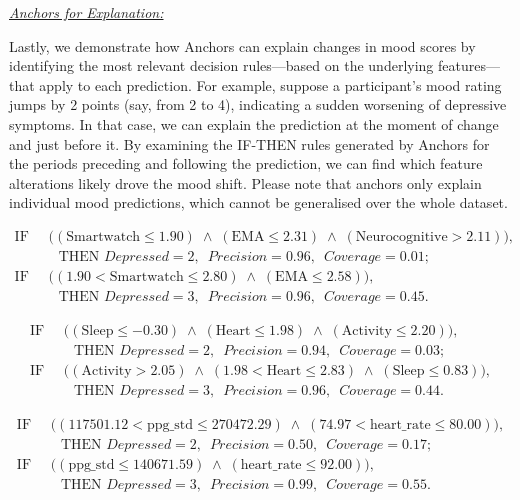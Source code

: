 \underline{\textit{Anchors for Explanation:}} 

Lastly, we demonstrate how Anchors can explain changes in mood scores by identifying the most relevant decision rules—based on the underlying features—that apply to each prediction. For example, suppose a participant's mood rating jumps by 2 points (say, from 2 to 4), indicating a sudden worsening of depressive symptoms. In that case, we can explain the prediction at the moment of change and just before it. By examining the IF-THEN rules generated by Anchors for the periods preceding and following the prediction,  we can find which feature alterations likely drove the mood shift. Please note that anchors only explain individual mood predictions, which cannot be generalised over the whole dataset.


\begin{equation}\label{eq:anchor19_3}
\begin{split}
\text{IF }&\;\bigl((\text{Smartwatch} \le 1.90)
    \;\land\; (\text{EMA} \le 2.31)
    \;\land\; (\text{Neurocognitive} > 2.11)\bigr),\\
 &\quad\text{THEN }Depressed = 2,\;\ Precision = 0.96,\;\ Coverage = 0.01;\\[6pt]
\text{IF }&\;\bigl((1.90 < \text{Smartwatch} \le 2.80)
    \;\land\; (\text{EMA} \le 2.58)\bigr),\\
 &\quad\text{THEN }Depressed = 3,\;\ Precision = 0.96,\;\ Coverage = 0.45.
\end{split}
\end{equation}




\begin{equation}\label{eq:anchor19_4}
\begin{split}
\text{IF }&\;\bigl((\text{Sleep} \le -0.30)
    \;\land\; (\text{Heart} \le 1.98)
    \;\land\; (\text{Activity} \le 2.20)\bigr),\\
 &\quad\text{THEN }Depressed = 2,\;\ Precision = 0.94,\;\ Coverage = 0.03;\\[6pt]
\text{IF }&\;\bigl((\text{Activity} > 2.05)
    \;\land\; (1.98 < \text{Heart} \le 2.83)
    \;\land\; (\text{Sleep} \le 0.83)\bigr),\\
 &\quad\text{THEN }Depressed = 3,\;\ Precision = 0.96,\;\ Coverage = 0.44.
\end{split}
\end{equation}

\begin{equation}\label{eq:anchor19_5}
\begin{split}
\text{IF }&\;\bigl((117501.12 < \text{ppg\_std} \le 270472.29)
    \;\land\; (74.97 < \text{heart\_rate} \le 80.00)\bigr),\\
 &\quad\text{THEN }Depressed = 2,\;\ Precision = 0.50,\;\ Coverage = 0.17;\\[6pt]
\text{IF }&\;\bigl((\text{ppg\_std} \le 140671.59)
    \;\land\; (\text{heart\_rate} \le 92.00)\bigr),\\
 &\quad\text{THEN }Depressed = 3,\;\ Precision = 0.99,\;\ Coverage = 0.55.
\end{split}
\end{equation}



